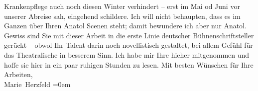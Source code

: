 \begin{ledgroupsized}[t]{13cm}
               Krankenpflege auch noch diesen Winter verhindert – erst im Mai{ }\introOben{}od Juni\introOben{} vor unserer Abreise sah, eingehend schildere.\pend
           \pstart
           Ich will nicht behaupten, dass es im Ganzen über Ihren Anatol Scenen steht; damit bewundere ich aber nur Anatol. Gewiss sind Sie mit dieser Arbeit in {\pb}die erste Linie deutscher Bühnenschriftsteller gerückt –
               obwol Ihr Talent darin noch novellistisch 
               gestaltet, bei allem Gefühl für das Theatralische in besserem Sinn. Ich habe mir Ihre
                  \label{K_L02590-4v}\label{K_L02590-4h}{ }hieher mitgenommen und hoffe
               sie hier in ein paar ruhigen
               Stunden zu lesen.\pend
           \pstart
           Mit besten Wünschen für Ihre Arbeiten, {\\[\baselineskip]}\spacefill\mbox{Marie Herzfeld}\pend
           \leftskip=0em{}
         
         \endnumbering{}\end{ledgroupsized}  \newcommand{\dateiname}{L02590}\newcommand{\titel}{Marie Herzfeld an Arthur Schnitzler, 7. 8. 1896}\newcommand{\editorInnen}{Martin Anton Müller und Laura Untner}
      